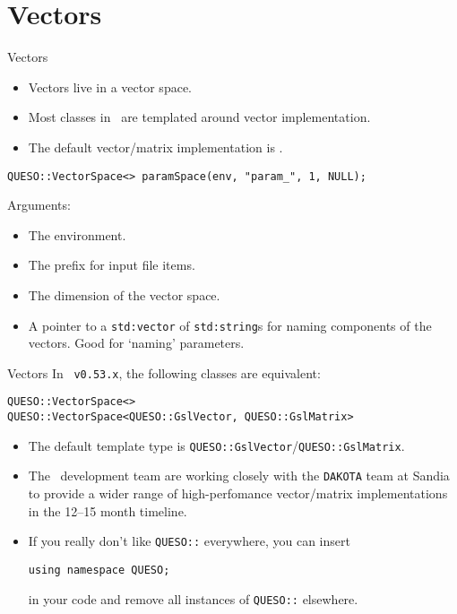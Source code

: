 \section{Vectors}
\begin{frame}[fragile]{Vectors}
  \begin{itemize}
    \item Vectors live in a vector space.
    \item Most classes in \Queso\ are templated around vector implementation.
    \item The default vector/matrix implementation is \Gsl.
  \end{itemize}
  \begin{verbatim}
QUESO::VectorSpace<> paramSpace(env, "param_", 1, NULL);
  \end{verbatim}
  Arguments:
  \begin{itemize}
    \item The environment.
    \item The prefix for input file items.
    \item The dimension of the vector space.
    \item A pointer to a \texttt{std:vector} of \texttt{std:string}s for naming
      components of the vectors.  Good for `naming' parameters.
  \end{itemize}
\end{frame}

\begin{frame}[fragile]{Vectors}
  In \Queso\ \texttt{v0.53.x}, the following classes are equivalent:
  \begin{verbatim}
QUESO::VectorSpace<>
QUESO::VectorSpace<QUESO::GslVector, QUESO::GslMatrix>
  \end{verbatim}
  \begin{itemize}
    \item The default template type is
      \texttt{QUESO::GslVector}/\texttt{QUESO::GslMatrix}.
    \item The \Queso\ development team are working closely with the
      \texttt{DAKOTA} team at Sandia to provide a wider range of
      high-perfomance vector/matrix implementations in the 12--15 month
      timeline.
    \item If you really don't like \texttt{QUESO::} everywhere, you can
      insert
      \begin{verbatim}
using namespace QUESO;
      \end{verbatim}
       in your code and remove all instances of \texttt{QUESO::} elsewhere.
  \end{itemize}
\end{frame}

